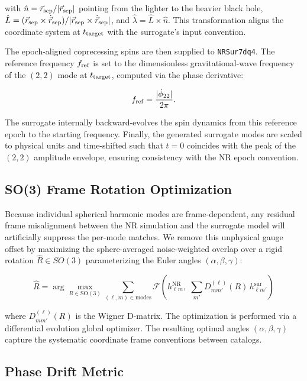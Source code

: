 \documentclass[%
 reprint,
superscriptaddress,
 amsmath,amssymb,
 aps,
]{revtex4-2}
\begin{document}
with $\hat{n} = \vec{r}_{\rm sep}/|\vec{r}_{\rm sep}|$ pointing from the lighter to the heavier black hole, $\hat{L} = (\vec{r}_{\rm sep} \times \dot{\vec{r}}_{\rm sep})/|\vec{r}_{\rm sep} \times \dot{\vec{r}}_{\rm sep}|$, and $\hat{\lambda} = \hat{L} \times \hat{n}$. This transformation aligns the coordinate system at $t_{\rm target}$ with the surrogate's input convention.

The epoch-aligned coprecessing spins are then supplied to \texttt{NRSur7dq4}. The reference frequency $f_{\rm ref}$ is set to the dimensionless gravitational-wave frequency of the $(2,2)$ mode at $t_{\rm target}$, computed via the phase derivative:

\begin{equation}f_{\rm ref} = \frac{|\dot\phi_{22}|}{2\pi}.\end{equation}

The surrogate internally backward-evolves the spin dynamics from this reference epoch to the starting frequency. Finally, the generated surrogate modes are scaled to physical units and time-shifted such that $t = 0$ coincides with the peak of the $(2,2)$ amplitude envelope, ensuring consistency with the NR epoch convention.

\subsection{SO(3) Frame Rotation Optimization}

Because individual spherical harmonic modes are frame-dependent, any residual frame misalignment between the NR simulation and the surrogate model will artificially suppress the per-mode matches. We remove this unphysical gauge offset by maximizing the sphere-averaged noise-weighted overlap over a rigid rotation $\hat{R} \in SO(3)$ parameterizing the Euler angles $(\alpha, \beta, \gamma)$:

\begin{equation}\hat{R} = \arg\max_{R \in \text{SO}(3)} \sum_{(\ell,m) \in \text{modes}} \mathcal{F}\left(h^\text{NR}_{\ell m},\;\sum_{m'} D^{(\ell)}_{m m'}(R)\,h^\text{sur}_{\ell m'}\right)\end{equation}

where $D^{(\ell)}_{m m'}(R)$ is the Wigner D-matrix. The optimization is performed via a differential evolution global optimizer. The resulting optimal angles $(\alpha, \beta, \gamma)$ capture the systematic coordinate frame conventions between catalogs. 

\subsection{Phase Drift Metric}
\end{document}
